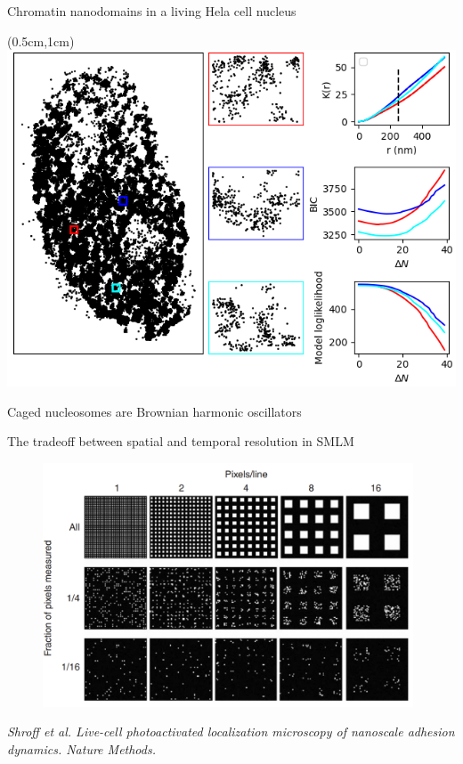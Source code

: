 \documentclass{beamer}					%
\begin{document}
\begin{frame}{Chromatin nanodomains in a living Hela cell nucleus}

\begin{textblock*}{10cm}(0.5cm,1cm)
\includegraphics[width=\textwidth]{Cluster.png}
\end{textblock*}

\end{frame}

\begin{frame}{Caged nucleosomes are Brownian harmonic oscillators}

\end{frame}


\begin{frame}{The tradeoff between spatial and temporal resolution in SMLM}
\begin{figure}
\includegraphics[width=11cm]{Shroff.png}
\end{figure}
\textit{Shroff et al. Live-cell photoactivated localization microscopy of
nanoscale adhesion dynamics. Nature Methods.}
\end{frame}
\end{document}
